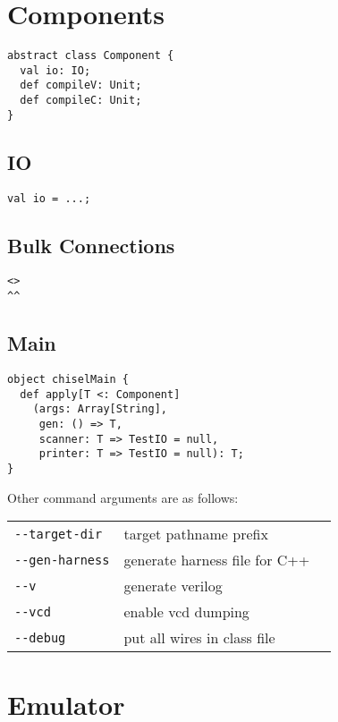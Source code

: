 \documentclass[10pt,twocolumn]{article}
\begin{document}
\section{Components}

\begin{verbatim}
abstract class Component {
  val io: IO;
  def compileV: Unit;
  def compileC: Unit;
}
\end{verbatim}

\subsection{IO}

\begin{verbatim}
val io = ...;
\end{verbatim}

\subsection{Bulk Connections}

\begin{verbatim}
<>
^^
\end{verbatim}

\subsection{Main}

\begin{verbatim}
object chiselMain {
  def apply[T <: Component]
    (args: Array[String], 
     gen: () => T, 
     scanner: T => TestIO = null, 
     printer: T => TestIO = null): T;
}
\end{verbatim}

Other command arguments are as follows:
\begin{tabular}{lll}
\verb+--target-dir+ & target pathname prefix \\
\verb+--gen-harness+ & generate harness file for C++ \\
\verb+--v+ & generate verilog \\
\verb+--vcd+ & enable vcd dumping \\
\verb+--debug+ & put all wires in class file \\
\end{tabular}

\section{Emulator}
\end{document}
